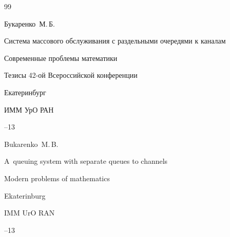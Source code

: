 \begin{thebibliography}{99}

\by Букаренко~М.\,Б.

\paper Система массового обслуживания с раздельными очередями к каналам

\inbook Современные проблемы математики

\bookinfo Тезисы 42-ой Всероссийской конференции

\publaddr Екатеринбург 

\publ ИММ УрО РАН


--13

\misctransl

\by  Bukarenko~M.\,B.

\paper  A~queuing system with separate queues to channels

\inbook Modern problems of mathematics

\publaddr Ekaterinburg

\publ IMM UrO RAN


--13





\end{thebibliography}



\noindent

\hskip6.5cm \thedate \par\noindent

\hskip6.5cm\therevdate





\vspace{-12mm}



\makeengtitle



\renewcommand{\baselinestretch}{0.9}



%




%








\newpage

%


%

%

